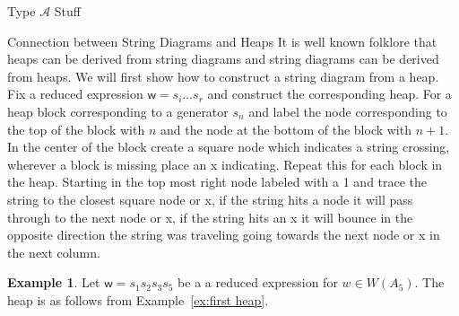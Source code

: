 \documentclass[11pt]{amsart}
\theoremstyle{definition}
\newtheorem{example}[theorem]{Example}
\numberwithin{equation}{section}
\newcommand{\A}{\mathcal{A}}
\renewcommand{\(}{\left(}
\renewcommand{\)}{\right)}
\newcommand{\w}{\mathsf{w}}
\newcommand\xxaxis{0}
\newcommand\yyaxis{90}
\newcommand\nsq[3]{\fill[fill=cyan!30, draw=black, rounded corners, line width=1pt, shift={(\xxaxis:#1)},shift={(\yyaxis:#2)}] (0,0) -- (2,0) -- (2,-2) -- (0,-2) --cycle;\node at (#1+1,#2-1) {$#3$};}
\begin{document}
\begin{section}{Type $\A$ Stuff}
\begin{subsection}{Connection between String Diagrams and Heaps}
It is well known folklore that heaps can be derived from string diagrams and string diagrams can be derived from heaps. We will first show how to construct a string diagram from a heap. Fix a reduced expression $\w=s_i\ldots s_r$ and construct the corresponding heap. For a heap block corresponding to a generator $s_n$ and label the node corresponding to the top of the block with $n$ and the node at the bottom of the block with $n+1$. In the center of the block create a square node which indicates a string crossing, wherever a block is missing place an x indicating. Repeat this for each block in the heap. Starting in the top most right node labeled with a 1 and trace the string to the closest square node or x, if the string hits a node it will pass through to the next node or x, if the string hits an x it will bounce in the opposite direction the string was traveling going towards the next node or x in the next column.
\begin{example}\label{ex:string to heap}
Let $\w=s_1 s_2 s_3 s_5$ be a a reduced expression for $w \in W(A_5)$. The heap is as follows from Example~\ref{ex:first heap}.\\




\end{example}
\end{subsection}
\end{section}
\end{document}
